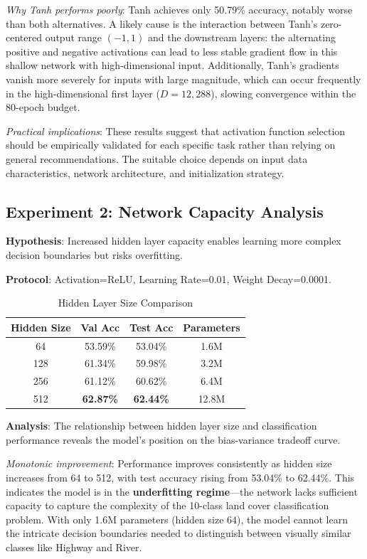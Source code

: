 \documentclass[sigconf,nonacm]{acmart}
\begin{document}
\textit{Why Tanh performs poorly}: Tanh achieves only 50.79\% accuracy, notably worse than both alternatives. A likely cause is the interaction between Tanh's zero-centered output range $(-1, 1)$ and the downstream layers: the alternating positive and negative activations can lead to less stable gradient flow in this shallow network with high-dimensional input. Additionally, Tanh's gradients vanish more severely for inputs with large magnitude, which can occur frequently in the high-dimensional first layer ($D=12{,}288$), slowing convergence within the 80-epoch budget.

\textit{Practical implications}: These results suggest that activation function selection should be empirically validated for each specific task rather than relying on general recommendations. The suitable choice depends on input data characteristics, network architecture, and initialization strategy.

\subsection{Experiment 2: Network Capacity Analysis}

\textbf{Hypothesis}: Increased hidden layer capacity enables learning more complex decision boundaries but risks overfitting.

\textbf{Protocol}: Activation=ReLU, Learning Rate=0.01, Weight Decay=0.0001.

\begin{table}[htbp]
\caption{Hidden Layer Size Comparison}
\label{tab:hidden}
\centering
\small
\begin{tabular}{cccc}
\toprule
Hidden Size & Val Acc & Test Acc & Parameters \\
\midrule
64 & 53.59\% & 53.04\% & 1.6M \\
128 & 61.34\% & 59.98\% & 3.2M \\
256 & 61.12\% & 60.62\% & 6.4M \\
512 & \textbf{62.87\%} & \textbf{62.44\%} & 12.8M \\
\bottomrule
\end{tabular}
\end{table}

\textbf{Analysis}: The relationship between hidden layer size and classification performance reveals the model's position on the bias-variance tradeoff curve.

\textit{Monotonic improvement}: Performance improves consistently as hidden size increases from 64 to 512, with test accuracy rising from 53.04\% to 62.44\%. This indicates the model is in the \textbf{underfitting regime}---the network lacks sufficient capacity to capture the complexity of the 10-class land cover classification problem. With only 1.6M parameters (hidden size 64), the model cannot learn the intricate decision boundaries needed to distinguish between visually similar classes like Highway and River.
\end{document}
